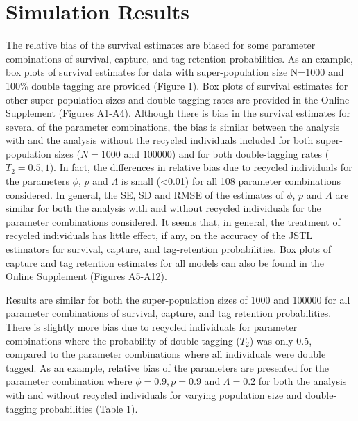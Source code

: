 \documentclass[]{article}
\begin{document}
\section{Simulation Results}\label{results}

The relative bias of the survival estimates are biased for some
parameter combinations of survival, capture, and tag retention
probabilities. As an example, box plots of survival estimates for data
with super-population size N=1000 and 100\% double tagging are provided
(Figure 1). Box plots of survival estimates for other super-population
sizes and double-tagging rates are provided in the Online Supplement (Figures
A1-A4). Although there is bias in the survival estimates for several of
the parameter combinations, the bias is similar between the analysis
with and the analysis without the recycled individuals included for both
super-population sizes (\(N=1000\) and \(100 000\)) and for both
double-tagging rates (\(T_2=0.5,1\)). In fact, the differences in
relative bias due to recycled individuals for the parameters \(\phi\),
\(p\) and \(\Lambda\) is small (\textless{}0.01) for all 108 parameter
combinations considered. In general, the SE, SD and RMSE of the
estimates of \(\phi\), \(p\) and \(\Lambda\) are similar for both the
analysis with and without recycled individuals for the parameter
combinations considered. It seems that, in general, the treatment of
recycled individuals has little effect, if any, on the accuracy of the
JSTL estimators for survival, capture, and tag-retention probabilities.
Box plots of capture and tag retention estimates for all models can also
be found in the Online Supplement (Figures A5-A12).

Results are similar for both the super-population sizes of 1000 and
100000 for all parameter combinations of survival, capture, and tag
retention probabilities. There is slightly more bias due to recycled
individuals for parameter combinations where the probability of double
tagging (\(T_2\)) was only 0.5, compared to the parameter combinations
where all individuals were double tagged. As an example, relative bias of
the parameters are presented for the parameter combination where
\(\phi=0.9, p=0.9\) and \(\Lambda=0.2\) for both the analysis with and
without recycled individuals for varying population size and
double-tagging probabilities (Table 1).
\end{document}
